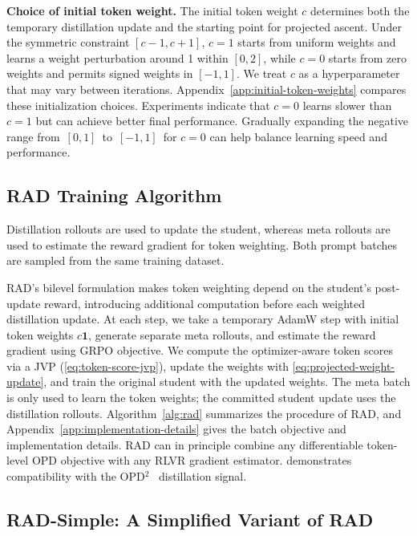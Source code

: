 \documentclass{article} %
\begin{document}
\noindent\textbf{Choice of initial token weight.}\enspace
The initial token weight \(c\) determines both the temporary distillation update and the starting point for projected ascent. Under the symmetric constraint \([c-1,c+1]\), \(c=1\) starts from uniform weights and learns a weight perturbation around 1 within \([0,2]\), while \(c=0\) starts from zero weights and permits signed weights in \([-1,1]\). We treat \(c\) as a hyperparameter that may vary between iterations. 
Appendix~\ref{app:initial-token-weights} compares these initialization choices. Experiments indicate that \(c=0\) learns slower than \(c=1\) but can achieve better final performance. Gradually expanding the negative range from \(\,[0,1]\,\) to \(\,[-1,1]\,\) for \(c=0\) can help balance learning speed and performance.

\subsection{RAD Training Algorithm}
\label{sec:batch-implementation}
Distillation rollouts are used to update the student, whereas meta rollouts
are used to estimate the reward gradient for token weighting. Both prompt
batches are sampled from the same training dataset.

RAD's bilevel formulation makes token weighting depend on the student's
post-update reward, introducing additional computation before each weighted
distillation update. At each step, we take a temporary AdamW step with
initial token weights \(c\mathbf 1\), generate separate meta rollouts,
and estimate the reward gradient using GRPO objective. 
We compute the optimizer-aware token scores via a JVP
(\cref{eq:token-score-jvp}), update the weights with
\cref{eq:projected-weight-update}, and train the original student with the
updated weights. The meta batch is only used to learn the token weights; the committed
student update uses the distillation rollouts. Algorithm~\ref{alg:rad}
summarizes the procedure of RAD, and Appendix~\ref{app:implementation-details}
gives the batch objective and implementation details.
RAD can in principle combine any differentiable token-level OPD objective
with any RLVR gradient estimator. 
demonstrates compatibility with the OPD$^2$~\citep{heo2026policy} distillation signal.

\subsection{RAD-Simple: A Simplified Variant of RAD}
\label{sec:rad-lite}
\end{document}
